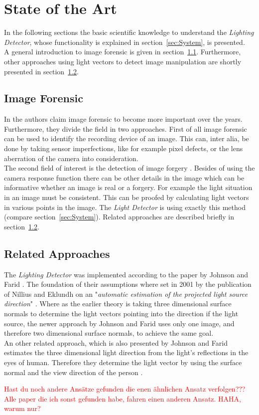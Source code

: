\section{State of the Art} \label{sec:StateOfTheArt}
In the following sections the basic scientific knowledge to understand the \textit{Lighting Detector}, whose functionality is explained in section~\ref{sec:System}, is presented.\\
A general introduction to image forensic is given in section~\ref{sec:imageForensic}.
Furthermore, other approaches using light vectors to detect image manipulation are shortly presented in section~\ref{sec:otherApproaches}.


\subsection{Image Forensic}\label{sec:imageForensic}
In \cite{4284575} the authors claim image forensic to become more important over the years. Furthermore, they divide the field in two approaches. First of all image forensic can be used to identify the recording device of an image. This can, inter alia, be done by taking sensor imperfections, like for example pixel defects, or the lens aberration of the camera into consideration. \\
The second field of interest is the detection of image forgery \cite{4806202}. Besides of using the camera response function there can be other details in the image which can be informative whether an image is real or a forgery. For example the light situation in an image must be consistent. This can be proofed by calculating light vectors in various points in the image. The \textit{Light Detector} is using exactly this method (compare section~\ref{sec:System}). Related approaches are described briefly in section~\ref{sec:otherApproaches}.


\subsection{Related Approaches} \label{sec:otherApproaches}
The \textit{Lighting Detector} was implemented according to the paper by Johnson and Farid \cite{Johnson}. The foundation of their assumptions where set in 2001 by the publication of Nillius and Eklundh on an "\textit{automatic estimation of the projected light source direction}" \cite{990650}. Where as the earlier theory is taking three dimensional surface normals to determine the light vectors pointing into the direction if the light source, the newer approach by Johnson and Farid uses only one image, and therefore two dimensional surface normals, to achieve the same goal. \\
An other related approach, which is also presented by Johnson and Farid estimates the three dimensional light direction from the light's reflections in the eyes of human. Therefore they determine the light vector by using the surface normal and the view direction of the person \cite{johnson06specular}.

\textcolor{red}{Hast du noch andere Ansätze gefunden die enen ähnlichen Ansatz verfolgen??? Alle paper die ich sonst gefunden habe, fahren einen anderen Ansatz. HAHA, warum nur?} 


\newpage

